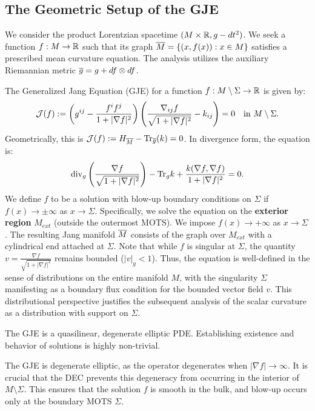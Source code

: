 \subsection{The Geometric Setup of the GJE}
We consider the product Lorentzian spacetime $(M \times \mathbb{R}, g - dt^2)$. We seek a function $f: M \to \mathbb{R}$ such that its graph $\overline{M} = \{(x, f(x)) : x \in M\}$ satisfies a prescribed mean curvature equation. The analysis utilizes the auxiliary Riemannian metric $\overline{g} = g + df \otimes df$.

\begin{definition}\label{def:JangEqn}
The Generalized Jang Equation (GJE) for a function $f: M \setminus \Sigma \to \mathbb{R}$ is given by:
\begin{equation}\label{eq:GJE}
    \mathcal{J}(f) := \left( g^{ij} - \frac{f^i f^j}{1+|\nabla f|^2} \right) \left( \frac{\nabla_{ij}f}{\sqrt{1+|\nabla f|^2}} - k_{ij} \right) = 0 \quad \text{in } M \setminus \Sigma.
\end{equation}
Geometrically, this is $\mathcal{J}(f) := H_{\overline{M}} - \mathrm{Tr}_{\overline{g}}(k) = 0$.
In divergence form, the equation is:
\[ \mathrm{div}_g \left( \frac{\nabla f}{\sqrt{1+|\nabla f|^2}} \right) - \mathrm{Tr}_g k + \frac{k(\nabla f, \nabla f)}{1+|\nabla f|^2} = 0. \]
We define $f$ to be a solution with blow-up boundary conditions on $\Sigma$ if $f(x) \to \pm\infty$ as $x \to \Sigma$. Specifically, we solve the equation on the \textbf{exterior region} $M_{ext}$ (outside the outermost MOTS). We impose $f(x) \to +\infty$ as $x \to \Sigma$. The resulting Jang manifold $\overline{M}$ consists of the graph over $M_{ext}$ with a cylindrical end attached at $\Sigma$. Note that while $f$ is singular at $\Sigma$, the quantity $v = \frac{\nabla f}{\sqrt{1+|\nabla f|^2}}$ remains bounded ($|v|_g < 1$). Thus, the equation is well-defined in the sense of distributions on the entire manifold $M$, with the singularity $\Sigma$ manifesting as a boundary flux condition for the bounded vector field $v$. This distributional perspective justifies the subsequent analysis of the scalar curvature as a distribution with support on $\Sigma$.
\end{definition}

The GJE is a quasilinear, degenerate elliptic PDE. Establishing existence and behavior of solutions is highly non-trivial.

\begin{remark}
The GJE is degenerate elliptic, as the operator degenerates when $|\nabla f| \to \infty$. It is crucial that the DEC prevents this degeneracy from occurring in the interior of $M\setminus\Sigma$. This ensures that the solution $f$ is smooth in the bulk, and blow-up occurs only at the boundary MOTS $\Sigma$.
\end{remark}

